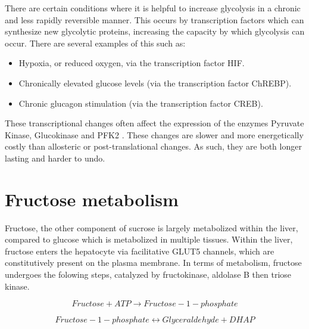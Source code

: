 \documentclass{tufte-handout}
\begin{document}
  There are certain conditions where it is helpful to increase glycolysis in a chronic and less rapidly reversible manner.  This occurs by transcription factors which can synthesize new glycolytic proteins, increasing the capacity by which glycolysis can occur.  There are several examples of this such as:

\begin{itemize}
\item Hypoxia, or reduced oxygen, via the transcription factor HIF.
\item Chronically elevated glucose levels (via the transcription factor ChREBP).    
\item Chronic glucagon stimulation (via the transcription factor CREB).
\end{itemize}

These transcriptional changes often affect the expression of the enzymes Pyruvate Kinase, Glucokinase and PFK2 \citep{Semenza1994,Kawaguchi2001}.  These changes are slower and more energetically costly than allosteric or post-translational changes.  As such, they are both longer lasting and harder to undo.

\section{Fructose metabolism}

Fructose, the other component of sucrose is largely metabolized within the liver, compared to glucose which is metabolized in multiple tissues.  Within the liver, fructose enters the hepatocyte via facilitative GLUT5 channels, which are constitutively present on the plasma membrane.  In terms of metabolism, fructose undergoes the folowing steps, catalyzed by fructokinase, aldolase B then triose kinase.

\begin{equation}
Fructose + ATP \rightarrow Fructose-1-phosphate
\end{equation}

\begin{equation}
Fructose-1-phosphate \leftrightarrow Glyceraldehyde + DHAP
\end{equation}
\end{document}

